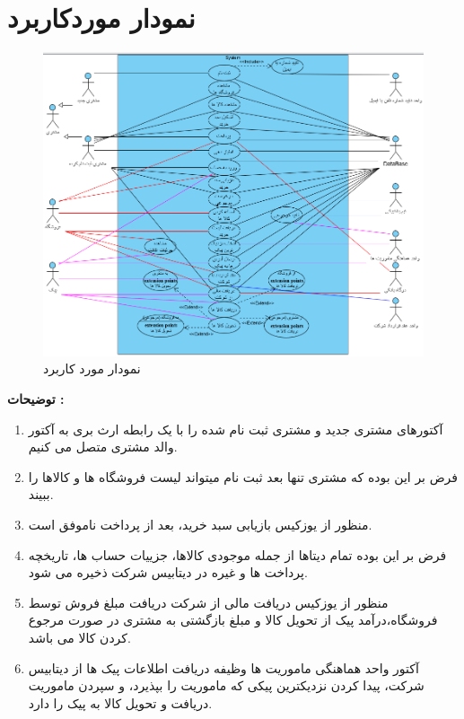 \documentclass[12pt,a4paper]{article}
\begin{document}
\maketitle
\pagebreak
\tableofcontents
\pagebreak
\listoffigures
\pagebreak
\normalsize	

\section{نمودار موردکاربرد} \label{section.useCase}
	\begin{figure}[h!]
		\begin{center}
			\includegraphics[width=12cm]{images/Use Case.png}
			
		\end{center}
		\caption{نمودار مورد کاربرد}
	\end{figure}
 

\textbf{توضیحات :} 
	\begin{enumerate}
		\item 
		آکتورهای مشتری جدید و مشتری ثبت نام شده را با یک رابطه ارث بری به آکتور والد مشتری متصل می کنیم.
		\item
		فرض بر این بوده که مشتری تنها بعد ثبت نام میتواند لیست فروشگاه ها و کالاها را ببیند.
		\item
		منظور از یوزکیس بازیابی سبد خرید، بعد از پرداخت ناموفق است.
		\item
		فرض بر این بوده تمام دیتاها از جمله موجودی کالاها، جزییات حساب ها، تاریخچه پرداخت ها و غیره در دیتابیس شرکت ذخیره می شود.
		\item
		منظور از یوزکیس دریافت مالی از شرکت دریافت مبلغ فروش توسط فروشگاه،درآمد پیک از تحویل کالا و مبلغ بازگشتی به مشتری در صورت مرجوع کردن کالا می باشد.
		\item
		آکتور واحد هماهنگی ماموریت ها وظیفه دریافت اطلاعات پیک ها از دیتابیس شرکت، پیدا کردن نزدیکترین پیکی که ماموریت را بپذیرد، و سپردن ماموریت دریافت و تحویل کالا به پیک را دارد.
	\end{enumerate}
\pagebreak
\end{document}
